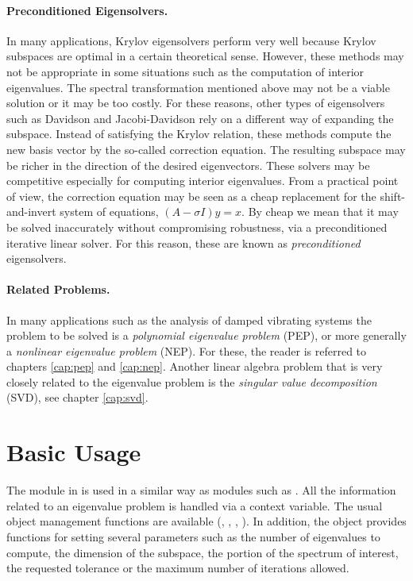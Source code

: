 \paragraph{Preconditioned Eigensolvers.}
In many applications, Krylov eigensolvers perform very well because Krylov subspaces are optimal in a certain theoretical sense. However, these methods may not be appropriate in some situations such as the computation of interior eigenvalues. The spectral transformation mentioned above may not be a viable solution or it may be too costly. For these reasons, other types of eigensolvers such as Davidson and Jacobi-Davidson rely on a different way of expanding the subspace. Instead of satisfying the Krylov relation, these methods compute the new basis vector by the so-called correction equation. The resulting subspace may be richer in the direction of the desired eigenvectors. These solvers may be competitive especially for computing interior eigenvalues. From a practical point of view, the correction equation may be seen as a cheap replacement for the shift-and-invert system of equations, $(A-\sigma I)y=x$. By cheap we mean that it may be solved inaccurately without compromising robustness, via a preconditioned iterative linear solver. For this reason, these are known as \emph{preconditioned} eigensolvers.

\paragraph{Related Problems.}

In many applications such as the analysis of damped vibrating systems the problem to be solved is a \emph{polynomial eigenvalue problem} (PEP), or more generally a \emph{nonlinear eigenvalue problem} (NEP). For these, the reader is referred to chapters \ref{cap:pep} and \ref{cap:nep}. Another linear algebra problem that is very closely related to the eigenvalue problem is the {\em singular value decomposition\/} (SVD), see chapter \ref{cap:svd}.

\section{Basic Usage}

The  module in \slepc is used in a similar way as \petsc modules such as . All the information related to an eigenvalue problem is handled via a context variable. The usual object management functions are available (, , , ). In addition, the  object provides functions for setting several parameters such as the number of eigenvalues to compute, the dimension of the subspace, the portion of the spectrum of interest, the requested tolerance or the maximum number of iterations allowed.

